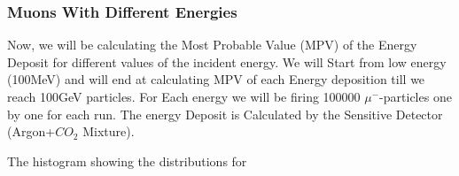 \documentclass{article}
\begin{document}
\begin{multicols}{2}
\subsubsection{Muons With Different Energies}

Now, we will be calculating the Most Probable Value (MPV) of the
Energy Deposit for different values of the incident energy. We will Start 
from low energy (100MeV) and will end at calculating MPV of each Energy deposition
till we reach 100GeV particles. For Each energy we will be firing 100000 $\mu^-$-particles
one by one for each run. The energy Deposit is Calculated by the Sensitive Detector 
(Argon+$CO_2$ Mixture).







The histogram showing the distributions for 





















\end{multicols}


\end{document}
